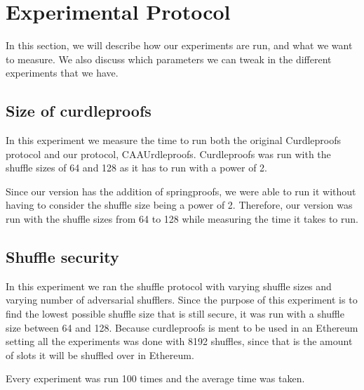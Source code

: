 
\section{Experimental Protocol}\label{sec:experimental-protocol}
In this section, we will describe how our experiments are run, and what we want to measure.
We also discuss which parameters we can tweak in the different experiments that we have.


\subsection{Size of curdleproofs}\label{sec:experimental-protocol-size}
In this experiment we measure the time to run both the original Curdleproofs protocol and our protocol, CAAUrdleproofs.
Curdleproofs was run with the shuffle sizes of 64 and 128 as it has to run with a power of 2.

Since our version has the addition of springproofs, we were able to run it without having to consider the shuffle size being a power of 2.
Therefore, our version was run with the shuffle sizes from 64 to 128 while measuring the time it takes to run.



\subsection{Shuffle security}\label{sec:experimental-protocol-shuffle-security}
In this experiment we ran the shuffle protocol with varying shuffle sizes and varying number of adversarial shufflers.
Since the purpose of this experiment is to find the lowest possible shuffle size that is still secure, it was run with a shuffle size between 64 and 128.
Because curdleproofs is ment to be used in an Ethereum setting all the experiments was done with 8192 shuffles, since that is the amount of slots it will be shuffled over in Ethereum.

Every experiment was run 100 times and the average time was taken.

